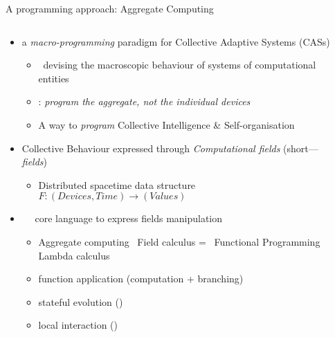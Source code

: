 \documentclass[8pt, aspectratio=169, handout]{beamer}
\begin{document}
\begin{frame}{A programming approach: Aggregate Computing~\cite{beal2015aggregate-programming}}
    \begin{columns}
      \begin{column}[c]{0.8\textwidth}
        \begin{card}[What?]
          \begin{itemize}
            \item[\success{\faInfo}] a \emph{macro-programming} paradigm for Collective Adaptive Systems (CASs)
            \begin{itemize}
              \item {} \faArrowRight \, devising the macroscopic behaviour of systems of computational entities
              \item {}: \emph{program the aggregate, not the individual devices}
              \item A way to \emph{program} Collective Intelligence \& Self-organisation 
            \end{itemize}
            \item[\success{\faInfo}] Collective Behaviour expressed through \emph{Computational fields} (short---\emph{fields})
            \begin{itemize}
              \item Distributed spacetime data structure \faArrowRight \, $F: (Devices, Time) \rightarrow (Values)$
            \end{itemize}
            \item[\success{\faInfo}] ~\cite{audrito2019tocl} \faArrowRight \, core language to express fields manipulation
            \begin{itemize}
              \item Aggregate computing \faArrowRight \, Field calculus = \, Functional Programming \faArrowRight \, Lambda calculus
              \item function application (computation + branching)
              \item stateful evolution ()
              \item local interaction ()
            \end{itemize}
          \end{itemize}
        \end{card}
      \end{column}
      \begin{column}[c]{0.2\textwidth}
      \end{column}
    \end{columns}
\end{frame}
\end{document}

